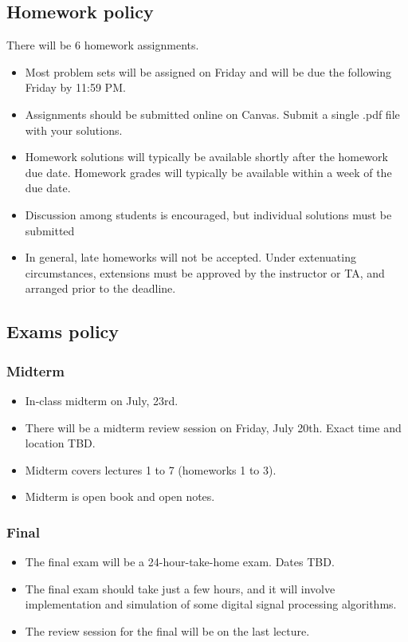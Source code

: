 \documentclass[10pt]{article}
\begin{document}
\subsection*{Homework policy}

There will be 6 homework assignments.
\begin{itemize}
	\item Most problem sets will be assigned on Friday and will be due the following Friday by 11:59 PM.
	\item Assignments should be submitted online on Canvas. Submit a single .pdf file with your solutions. 
	\item Homework solutions will typically be available shortly after the homework due date. Homework grades will typically be available within a week of the due date.
	\item Discussion among students is encouraged, but individual solutions must be submitted
	\item In general, late homeworks will not be accepted. Under extenuating circumstances, extensions must be approved by the instructor or TA, and arranged prior to the deadline.
\end{itemize}

\subsection*{Exams policy}
\subsubsection*{Midterm}
\begin{itemize}
	\item In-class midterm on July, 23rd. 
	\item There will be a midterm review session on Friday, July 20th. Exact time and location TBD.
	\item Midterm covers lectures 1 to 7 (homeworks 1 to 3).
	\item Midterm is open book and open notes.
\end{itemize}

\subsubsection*{Final}
\begin{itemize}
	\item The final exam will be a 24-hour-take-home exam. Dates TBD.
	\item The final exam should take just a few hours, and it will involve implementation and simulation of some digital signal processing algorithms.
	\item The review session for the final will be on the last lecture.
\end{itemize}
\end{document}
